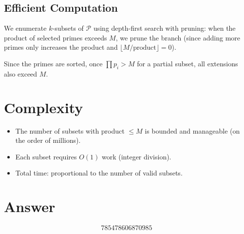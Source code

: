 \documentclass[12pt]{article}
\theoremstyle{definition}
\begin{document}
\subsection{Efficient Computation}
We enumerate $k$-subsets of $\mathcal{P}$ using depth-first search with pruning: when the product of selected primes exceeds $M$, we prune the branch (since adding more primes only increases the product and $\lfloor M/\text{product}\rfloor = 0$).

Since the primes are sorted, once $\prod p_i > M$ for a partial subset, all extensions also exceed $M$.

\section{Complexity}
\begin{itemize}
    \item The number of subsets with product $\leq M$ is bounded and manageable (on the order of millions).
    \item Each subset requires $O(1)$ work (integer division).
    \item Total time: proportional to the number of valid subsets.
\end{itemize}

\section{Answer}

\[
\boxed{785478606870985}
\]
\end{document}
